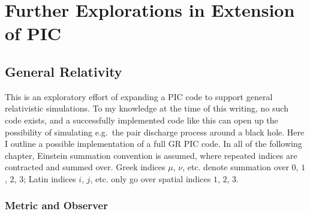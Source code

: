 
\chapter{Further Explorations in Extension of PIC}
\label{chap:explorations}

\section{General Relativity}
\label{sec:general-relativity}

This is an exploratory effort of expanding a PIC code to support general
relativistic simulations. To my knowledge at the time of this writing, no such
code exists, and a successfully implemented code like this can open up the
possibility of simulating e.g.\ the pair discharge process around a black hole.
Here I outline a possible implementation of a full GR PIC code. In all of the
following chapter, Einstein summation convention is assumed, where repeated
indices are contracted and summed over. Greek indices $\mu$, $\nu$, etc. denote
summation over $0$, $1$, $2$, $3$; Latin indices $i$, $j$, etc. only go over
spatial indices $1$, $2$, $3$.

\subsection{Metric and Observer}
\label{sec:metric}

